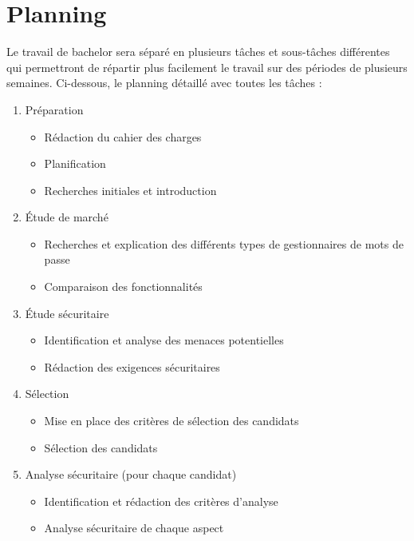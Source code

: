 

\chapter{Planning}
Le travail de bachelor sera séparé en plusieurs tâches et sous-tâches différentes qui permettront de répartir plus facilement le travail sur des périodes de plusieurs semaines. Ci-dessous, le planning détaillé avec toutes les tâches : 

\begin{enumerate}
	\item Préparation
	\begin{itemize}
		\item Rédaction du cahier des charges
		\item Planification
		\item Recherches initiales et introduction
	\end{itemize}
	\item Étude de marché
		\begin{itemize}
			\item Recherches et explication des différents types de gestionnaires de mots de passe
			\item Comparaison des fonctionnalités
		\end{itemize}
	\item Étude sécuritaire
		\begin{itemize}
			\item Identification et analyse des menaces potentielles
			\item Rédaction des exigences sécuritaires
		\end{itemize}
	\item Sélection
		\begin{itemize}
			\item Mise en place des critères de sélection des candidats
			\item Sélection des candidats
		\end{itemize}
	\item Analyse sécuritaire (pour chaque candidat)
		\begin{itemize}
			\item Identification et rédaction des critères d'analyse 
			\item Analyse sécuritaire de chaque aspect

\end{itemize}
\end{enumerate}
